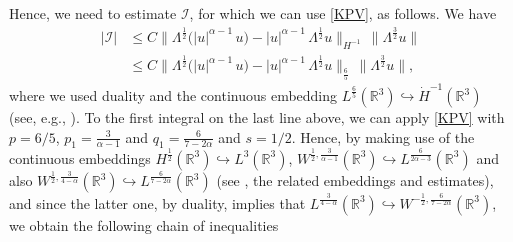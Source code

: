 \documentclass[a4paper]{article}
\begin{document}
  Hence, we need to estimate $\mathcal I$, for which we can use
  \eqref{KPV}, as follows. We have
  \begin{equation*}
    \begin{aligned}
      |\mathcal I| &\le C\|\Lambda^\frac12\big(|u|^{\alpha-1}\,
      u\big)-|u|^{\alpha-1}\, \Lambda^\frac12 u\|_{H^{-1}}\,
      \|\Lambda^\frac32 u\|
      \\
      & \le C\|\Lambda^\frac12\big(|u|^{\alpha-1}\,
      u\big)-|u|^{\alpha-1}\, \Lambda^\frac12 u\|_{\frac65}\,
      \|\Lambda^\frac32 u\|,
    \end{aligned}
  \end{equation*}
  where we used duality and the continuous embedding
  $L^\frac{6}{5}(\mathbb R^3) \hookrightarrow \dot H^{-1}(\mathbb R^3)$ (see, e.g., \cite{Zhao}). To
  the first integral on the last line above, we can apply \eqref{KPV}
  with $p=6/5$, $p_1= \frac{3}{\alpha-1}$ and
  $q_1= \frac{6}{7-2\alpha}$ and $s=1/2$. {Hence, by making use of the continuous embeddings
  $H^\frac12(\mathbb R^3) \hookrightarrow L^3(\mathbb R^3)$,
  $W^{\frac12, \frac{3}{\alpha-1}}(\mathbb R^3) \hookrightarrow
  L^{\frac{6}{2\alpha-3}}(\mathbb R^3)$ and also $W^{\frac12, \frac{3}{4-\alpha}}(\mathbb R^3) \hookrightarrow
  L^{\frac{6}{7-2\alpha}}(\mathbb R^3)$ (see \cite[Theorem 6.5]{DiNezza}, the related embeddings and estimates),
  and since the latter one, by duality, implies that $L^\frac{3}{4-\alpha}(\mathbb R^3)
  \hookrightarrow W^{-\frac12, \frac{6}{7-2\alpha}}(\mathbb R^3) $, we obtain the following chain of inequalities}
\end{document}
